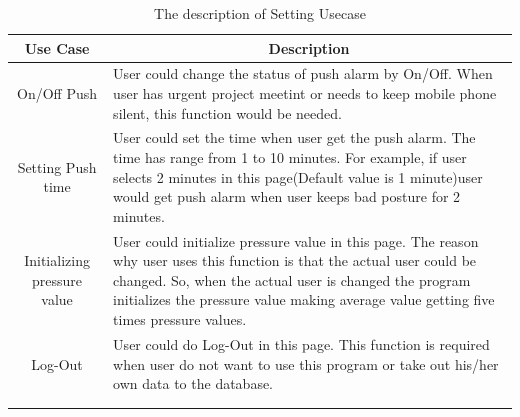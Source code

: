 \documentclass[conference]{IEEEtran}
\begin{document}
\begin{table}[h]
{\renewcommand\arraystretch{1.25}
\caption{The description of Setting Usecase}
\begin{tabular}{|c|l|l|} \hline
Use Case & \multicolumn{2}{c|}{Description} \\ \hline\hline
On/Off Push & \multicolumn{2}{p{5cm}|}{\raggedright User could change the status of push alarm by On/Off. When user has urgent project meetint or needs to keep mobile phone silent, this function would be needed.} \\ \hline
Setting Push time & \multicolumn{2}{p{5cm}|}{\raggedright User could set the time when user get the push alarm. The time has range from 1 to 10 minutes. For example, if user selects 2 minutes in this page(Default value is 1 minute)user would get push alarm when user keeps bad posture for 2 minutes.  } \\ \hline
Initializing pressure value & \multicolumn{2}{p{5cm}|}{\raggedright User could initialize pressure value in this page. The reason why user uses this function is that the actual user could be changed. So, when the actual user is changed the program initializes the pressure value making average value getting five times pressure values. } \\ \hline
Log-Out & \multicolumn{2}{p{5cm}|}{\raggedright User could do Log-Out in this page. This function is required when user do not want to use this program or take out his/her own data to the database. } \\\\\\ \hline
\end{tabular}}
\end{table}
\end{document}

